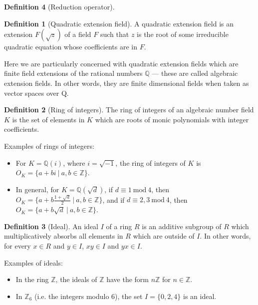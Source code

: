\documentclass{article}
\theoremstyle{definition}
\newtheorem{definition}{Definition}[section]
\theoremstyle{theorem}
\theoremstyle{example}
\theoremstyle{corollary}
\begin{document}
\begin{definition}[Reduction operator]
\bigskip

\theoremstyle{definition}
\begin{definition}[Quadratic extension field]
A quadratic extension field is an extension \(F(\sqrt{z})\) of a field \(F\) such that \(z\) is the root of some irreducible quadratic equation whose coefficients are in \(F\).
\end{definition}

\bigskip

Here we are particularly concerned with quadratic extension fields which are finite field extensions of the rational numbers \(\mathbb{Q}\) --- these are called algebraic extension fields. In other words, they are finite dimensional fields when taken as vector spaces over Q.


\bigskip

\theoremstyle{definition}
\begin{definition}[Ring of integers]
The ring of integers of an algebraic number field \(K\) is the set of elements in \(K\) which are roots of monic polynomials with integer coefficients.
\end{definition}

\bigskip

Examples of rings of integers:
\begin{itemize}
\item For \(K = \mathbb{Q}(i)\), where \(i = \sqrt{-1}\), the ring of integers of \(K\) is \(O_{K} = \{a + b i \ | \ a, b \in \mathbb{Z} \} \).
\item In general, for \(K = \mathbb{Q}(\sqrt{d})\), if \(d \equiv 1 \ \textrm{mod} \ 4\), then \(O_{K} = \{ a + b \frac{1 + \sqrt{d}}{2} \ | \ a, b \in \mathbb{Z} \} \), and if \(d \equiv 2, 3 \ \textrm{mod} \ 4\), then \(O_{K} = \{ a + b \sqrt{d} \ | \ a, b \in \mathbb{Z} \} \).
\end{itemize}

\bigskip

\theoremstyle{definition}
\begin{definition}[Ideal]
An ideal \(I\) of a ring \(R\) is an additive subgroup of \(R\) which multiplicatively absorbs all elements in \(R\) which are outside of \(I\). In other words, for every \(x \in R\) and \(y \in I\), \(xy \in I\) and \(yx \in I\).
\end{definition}

\bigskip

Examples of ideals:
\begin{itemize}
\item In the ring \(\mathbb{Z}\), the ideals of \(\mathbb{Z}\) have the form \(n\mathbb{Z}\) for \(n \in \mathbb{Z}\).
\item In \(\mathbb{Z}_{6}\) (i.e. the integers modulo \(6\)), the set \(I = \{ 0, 2, 4 \}\) is an ideal.
\end{itemize}


\end{definition}
\end{document}
